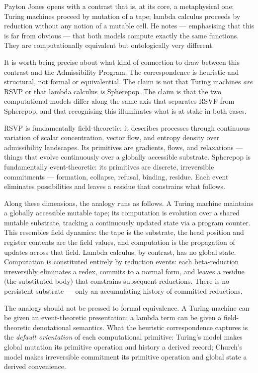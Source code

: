 \documentclass[12pt]{article}
\begin{document}
Payton Jones opens with a contrast that is, at its core, a metaphysical one:
Turing machines proceed by mutation of a tape; lambda calculus proceeds by
reduction without any notion of a mutable cell. He notes — emphasising that
this is far from obvious — that both models compute exactly the same functions.
They are computationally equivalent but ontologically very different.

It is worth being precise about what kind of connection to draw between this
contrast and the Admissibility Program. The correspondence is heuristic and
structural, not formal or equivalential. The claim is not that Turing machines
\emph{are} RSVP or that lambda calculus \emph{is} Spherepop. The claim is
that the two computational models differ along the same axis that separates
RSVP from Spherepop, and that recognising this illuminates what is at stake
in both cases.

RSVP is fundamentally field-theoretic: it describes processes through
continuous variation of scalar concentration, vector flow, and entropy density
over admissibility landscapes. Its primitives are gradients, flows, and
relaxations — things that evolve continuously over a globally accessible
substrate. Spherepop is fundamentally event-theoretic: its primitives are
discrete, irreversible commitments — formation, collapse, refusal, binding,
residue. Each event eliminates possibilities and leaves a residue that
constrains what follows.

Along these dimensions, the analogy runs as follows. A Turing machine maintains
a globally accessible mutable tape; its computation is evolution over a shared
mutable substrate, tracking a continuously updated state via a program counter.
This resembles field dynamics: the tape is the substrate, the head position and
register contents are the field values, and computation is the propagation of
updates across that field. Lambda calculus, by contrast, has no global state.
Computation is constituted entirely by reduction events: each beta-reduction
irreversibly eliminates a redex, commits to a normal form, and leaves a residue
(the substituted body) that constrains subsequent reductions. There is no
persistent substrate — only an accumulating history of committed reductions.

The analogy should not be pressed to formal equivalence. A Turing machine can
be given an event-theoretic presentation; a lambda term can be given a
field-theoretic denotational semantics. What the heuristic correspondence
captures is the \emph{default orientation} of each computational primitive:
Turing's model makes global mutation its primitive operation and history a
derived record; Church's model makes irreversible commitment its primitive
operation and global state a derived convenience.
\end{document}
